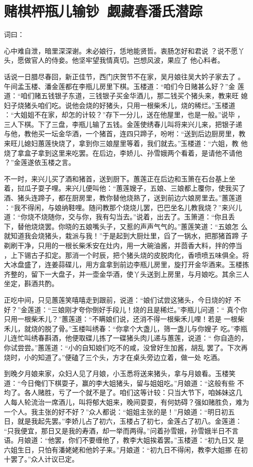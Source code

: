 \chapter{赌棋枰瓶儿输钞~觑藏春潘氏潜踪}

词曰：

心中难自泄，暗里深深谢。未必娘行，恁地能贤哲。衷肠怎好和君说
？说不愿丫头，愿做官人的侍妾。他坚牢望我情真切。岂想风波，果应了
他心料者。

话说一日腊尽春回，新正佳节，西门庆贺节不在家，吴月娘往吴大妗子家去了
。午间孟玉楼、潘金莲都在李瓶儿房里下棋。玉楼道：“咱们今日赌甚么好？”金
莲道：“咱们赌五钱银子东道，三钱银子买金华酒儿，那二钱买个猪头来，教来旺
媳妇子烧猪头咱们吃。说他会烧的好猪头，只用一根柴禾儿，烧的稀烂。”玉楼道
：“大姐姐不在家，却怎的计较？”存下一分儿，送在他屋里，也是一般。”说毕
，三人下棋。下了三盘，李瓶儿输了五钱。金莲使绣春儿叫将来兴儿来，把银子递
与他，教他买一坛金华酒，一个猪首，连四只蹄子，吩咐：“送到后边厨房里，教
来旺儿媳妇蕙莲快烧了，拿到你三娘屋里等着，我们就去。”玉楼道：“六姐，教
他烧了拿盒子拿到这里来吃罢。在后边，李娇儿、孙雪娥两个看着，是请他不请他
？”金莲遂依玉楼之言。

不一时，来兴儿买了酒和猪首，送到厨下。蕙莲正在后边和玉箫在石台基上坐
着，挝瓜子耍子哩。来兴儿便叫他：“蕙莲嫂子，五娘、三娘都上覆你，使我买了
酒、猪头连蹄子，都在厨房里，教你替他烧熟了，送到前边六娘房里去。”蕙莲道
：“我不得闲，与娘纳鞋哩。随问教那个烧烧儿罢，巴巴坐名儿教我烧？”来兴儿
道：“你烧不烧随你，交与你，我有勾当去。”说着，出去了。玉箫道：“你且丢
下，替他烧烧罢。你晓的五娘嘴头子，又惹的声声气气的。”蕙莲笑道：“五娘怎
么就知道我会烧猪头，栽派与我！”于是起到大厨灶里，舀了一锅水，把那猪首蹄
子剃刷干净，只用的一根长柴禾安在灶内，用一大碗油酱，并茴香大料，拌的停当
，上下锡古子扣定。那消一个时辰，把个猪头烧的皮脱肉化，香喷喷五味俱全。将
大冰盘盛了，连姜蒜碟儿，用方盒拿到前边李瓶儿房里，旋打开金华酒来。玉楼拣
齐整的，留下一大盘子，并一壶金华酒，使丫头送到上房里，与月娘吃。其余三人
坐定，斟酒共酌。

正吃中间，只见蕙莲笑嘻嘻走到跟前，说道：“娘们试尝这猪头，今日烧的好
不好？”金莲道：“三娘刚才夸你倒好手段儿！烧的且是稀烂。”李瓶儿问道：“
真个你只用一根柴禾儿？”蕙莲道：“不瞒娘们说，还消不得一根柴禾儿哩！若是
一根柴禾儿，就烧的脱了骨。”玉楼叫绣春：“你拿个大盏儿，筛一盏儿与你嫂子
吃。”李瓶儿连忙叫绣春斟酒，他便取碟儿拣了一碟猪头肉儿递与蕙莲，说道：“
你自造的，你试尝尝。”蕙莲道：“小的自知娘们吃不的咸，没曾好生加酱，胡乱
罢了。下次再烧时，小的知道了。”便磕了三个头，方才在桌头旁边立着，做一处
吃酒。

到晚夕月娘来家，众妇人见了月娘，小玉悉将送来猪头，拿与月娘看。玉楼笑
道：“今日俺们下棋耍子，赢的李大姐猪头，留与姐姐吃。”月娘道：“这般有些
不均了。各人赌胜，亏了一个就不是了。咱们这等计较：只当大节下，咱姊妹这几
人每人轮流治一席酒儿，叫将郁大姐来，晚间耍耍，有何妨碍？强如赌胜负，难为
一个人。我主张的好不好？”众人都说：“姐姐主张的是！”月娘道：“明日初五
日，就是我起先罢。”李娇儿占了初六，玉楼占了初七，金莲占了初八。金莲道：
“只我便宜，那日又是我的寿酒，却一举而两得。”问着孙雪娥，孙雪娥半日不言
语。月娘道：“他罢，你们不要缠他了，教李大姐挨着罢。”玉楼道：“初九日又
是六姐生日，只怕有潘姥姥和他妗子来。”月娘道：“初九日不得闲，教李大姐挪
在初十罢了。”众人计议已定。

